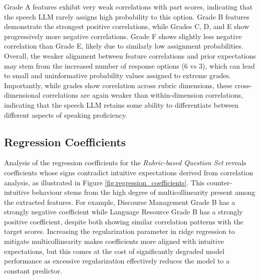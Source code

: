 \documentclass{report}
\begin{document}
Grade A features exhibit very weak correlations with part scores, indicating that the speech LLM rarely assigns high probability to this option. Grade B features demonstrate the strongest positive correlations, while Grades C, D, and E show progressively more negative correlations. Grade F shows slightly less negative correlation than Grade E, likely due to similarly low assignment probabilities. Overall, the weaker alignment between feature correlations and prior expectations may stem from the increased number of response options (6 vs 3), which can lead to small and uninformative probability values assigned to extreme grades. Importantly, while grades show correlation across rubric dimensions, these cross-dimensional correlations are again weaker than within-dimension correlations, indicating that the speech LLM retains some ability to differentiate between different aspects of speaking proficiency.

\subsection{Regression Coefficients}
\label{subsec:regression_coefficients}
Analysis of the regression coefficients for the \emph{Rubric-based Question Set} reveals coefficients whose signs contradict intuitive expectations derived from correlation analysis, as illustrated in Figure \ref{fig:regression_coefficients}. This counter-intuitive behaviour stems from the high degree of multicollinearity present among the extracted features. For example, Discourse Management Grade B has a strongly negative coefficient while Language Resource Grade B has a strongly positive coefficient, despite both showing similar correlation patterns with the target scores. Increasing the regularization parameter in ridge regression to mitigate multicollinearity makes coefficients more aligned with intuitive expectations, but this comes at the cost of significantly degraded model performance as excessive regularization effectively reduces the model to a constant predictor.
\end{document}
